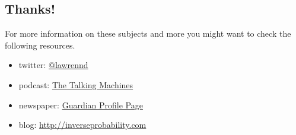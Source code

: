 \hypertarget{thanks}{%
\subsection{Thanks!}\label{thanks}}

For more information on these subjects and more you might want to check
the following resources.

\begin{itemize}
\tightlist
\item
  twitter: \href{https://twitter.com/lawrennd}{@lawrennd}
\item
  podcast: \href{http://thetalkingmachines.com}{The Talking Machines}
\item
  newspaper:
  \href{http://www.theguardian.com/profile/neil-lawrence}{Guardian
  Profile Page}
\item
  blog:
  \href{http://inverseprobability.com/blog.html}{http://inverseprobability.com}
\end{itemize}

